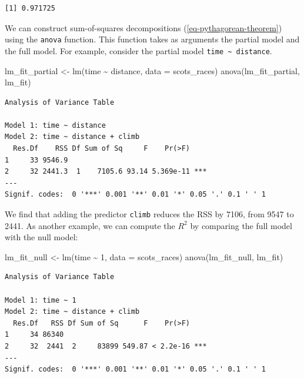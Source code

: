 \documentclass[
  11pt,
  letterpaper,
  oneside]{book}
\newenvironment{Shaded}{\begin{snugshade}}{\end{snugshade}}
\newcommand{\AttributeTok}[1]{\textcolor[rgb]{0.40,0.45,0.13}{#1}}
\newcommand{\DecValTok}[1]{\textcolor[rgb]{0.68,0.00,0.00}{#1}}
\newcommand{\FunctionTok}[1]{\textcolor[rgb]{0.28,0.35,0.67}{#1}}
\newcommand{\NormalTok}[1]{\textcolor[rgb]{0.00,0.23,0.31}{#1}}
\newcommand{\OtherTok}[1]{\textcolor[rgb]{0.00,0.23,0.31}{#1}}
\newcommand{\SpecialCharTok}[1]{\textcolor[rgb]{0.37,0.37,0.37}{#1}}
\theoremstyle{plain}
\theoremstyle{plain}
\theoremstyle{definition}
\theoremstyle{definition}
\theoremstyle{plain}
\theoremstyle{remark}
\begin{document}
\begin{verbatim}
[1] 0.971725
\end{verbatim}

We can construct sum-of-squares decompositions
(\ref{eq-pythagorean-theorem}) using the \texttt{anova} function. This
function takes as arguments the partial model and the full model. For
example, consider the partial model
\texttt{time\ \textasciitilde{}\ distance}.

\begin{Shaded}
\begin{Highlighting}[]
\NormalTok{lm\_fit\_partial }\OtherTok{\textless{}{-}} \FunctionTok{lm}\NormalTok{(time }\SpecialCharTok{\textasciitilde{}}\NormalTok{ distance, }\AttributeTok{data =}\NormalTok{ scots\_races)}
\FunctionTok{anova}\NormalTok{(lm\_fit\_partial, lm\_fit)}
\end{Highlighting}
\end{Shaded}

\begin{verbatim}
Analysis of Variance Table

Model 1: time ~ distance
Model 2: time ~ distance + climb
  Res.Df    RSS Df Sum of Sq     F    Pr(>F)    
1     33 9546.9                                 
2     32 2441.3  1    7105.6 93.14 5.369e-11 ***
---
Signif. codes:  0 '***' 0.001 '**' 0.01 '*' 0.05 '.' 0.1 ' ' 1
\end{verbatim}

We find that adding the predictor \texttt{climb} reduces the RSS by
7106, from 9547 to 2441. As another example, we can compute the \(R^2\)
by comparing the full model with the null model:

\begin{Shaded}
\begin{Highlighting}[]
\NormalTok{lm\_fit\_null }\OtherTok{\textless{}{-}} \FunctionTok{lm}\NormalTok{(time }\SpecialCharTok{\textasciitilde{}} \DecValTok{1}\NormalTok{, }\AttributeTok{data =}\NormalTok{ scots\_races)}
\FunctionTok{anova}\NormalTok{(lm\_fit\_null, lm\_fit)}
\end{Highlighting}
\end{Shaded}

\begin{verbatim}
Analysis of Variance Table

Model 1: time ~ 1
Model 2: time ~ distance + climb
  Res.Df   RSS Df Sum of Sq      F    Pr(>F)    
1     34 86340                                  
2     32  2441  2     83899 549.87 < 2.2e-16 ***
---
Signif. codes:  0 '***' 0.001 '**' 0.01 '*' 0.05 '.' 0.1 ' ' 1
\end{verbatim}
\end{document}
